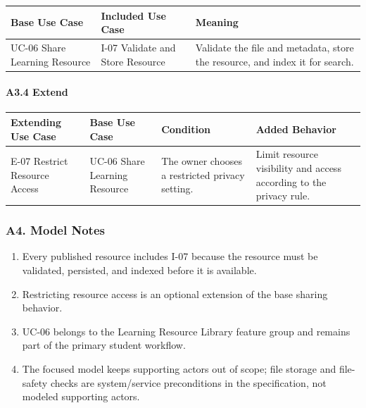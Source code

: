 \documentclass[12pt]{article}
\renewcommand{\baselinestretch}{1.5}
\begin{document}
\begingroup
\small
\renewcommand{\baselinestretch}{1.0}\selectfont
\renewcommand{\arraystretch}{1.15}
\setlength{\tabcolsep}{6pt}
\begin{longtable}{|>{\raggedright\arraybackslash}p{}|>{\raggedright\arraybackslash}p{}|>{\raggedright\arraybackslash}p{}|}
\hline
\textbf{Base Use Case} & \textbf{Included Use Case} & \textbf{Meaning} \\ \hline
\endhead
UC-06 Share Learning Resource & I-07 Validate and Store Resource & Validate the file and metadata, store the resource, and index it for search. \\ \hline
\end{longtable}
\endgroup
\par\medskip

\hypertarget{sec:a3-4-extend}{}
\paragraph*{A3.4 Extend}
\par\medskip

\begingroup
\small
\renewcommand{\baselinestretch}{1.0}\selectfont
\renewcommand{\arraystretch}{1.15}
\setlength{\tabcolsep}{6pt}
\begin{longtable}{|>{\raggedright\arraybackslash}p{}|>{\raggedright\arraybackslash}p{}|>{\raggedright\arraybackslash}p{}|>{\raggedright\arraybackslash}p{}|}
\hline
\textbf{Extending Use Case} & \textbf{Base Use Case} & \textbf{Condition} & \textbf{Added Behavior} \\ \hline
\endhead
E-07 Restrict Resource Access & UC-06 Share Learning Resource & The owner chooses a restricted privacy setting. & Limit resource visibility and access according to the privacy rule. \\ \hline
\end{longtable}
\endgroup
\par\medskip

\hypertarget{sec:a4-model-notes}{}
\subsubsection*{A4. Model Notes}
\par\medskip

\begin{enumerate}
\item Every published resource includes I-07 because the resource must be validated, persisted, and indexed before it is available.
\item Restricting resource access is an optional extension of the base sharing behavior.
\item UC-06 belongs to the Learning Resource Library feature group and remains part of the primary student workflow.
\item The focused model keeps supporting actors out of scope; file storage and file-safety checks are system/service preconditions in the specification, not modeled supporting actors.
\end{enumerate}
\par\medskip
\end{document}
